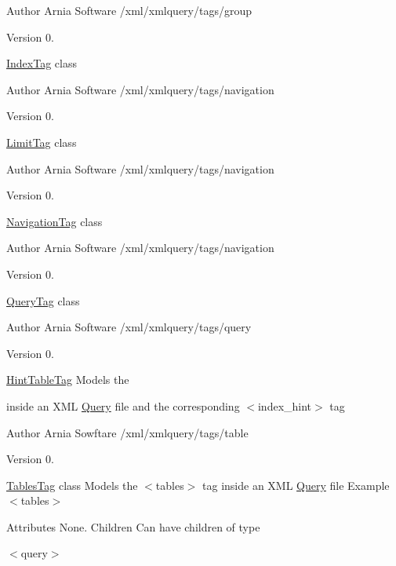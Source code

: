 \begin{DoxyAuthor}{Author}
Arnia Software /xml/xmlquery/tags/group 
\end{DoxyAuthor}
\begin{DoxyVersion}{Version}
0.
\end{DoxyVersion}
\hyperlink{classIndexTag}{Index\+Tag} class

\begin{DoxyAuthor}{Author}
Arnia Software /xml/xmlquery/tags/navigation 
\end{DoxyAuthor}
\begin{DoxyVersion}{Version}
0.
\end{DoxyVersion}
\hyperlink{classLimitTag}{Limit\+Tag} class

\begin{DoxyAuthor}{Author}
Arnia Software /xml/xmlquery/tags/navigation 
\end{DoxyAuthor}
\begin{DoxyVersion}{Version}
0.
\end{DoxyVersion}
\hyperlink{classNavigationTag}{Navigation\+Tag} class

\begin{DoxyAuthor}{Author}
Arnia Software /xml/xmlquery/tags/navigation 
\end{DoxyAuthor}
\begin{DoxyVersion}{Version}
0.
\end{DoxyVersion}
\hyperlink{classQueryTag}{Query\+Tag} class

\begin{DoxyAuthor}{Author}
Arnia Software /xml/xmlquery/tags/query 
\end{DoxyAuthor}
\begin{DoxyVersion}{Version}
0.
\end{DoxyVersion}
\hyperlink{classHintTableTag}{Hint\+Table\+Tag} Models the \begin{TabularC}{0}
\hline
\end{TabularC}
inside an X\+M\+L \hyperlink{classQuery}{Query} file and the corresponding $<$index\+\_\+hint$>$ tag

\begin{DoxyAuthor}{Author}
Arnia Sowftare /xml/xmlquery/tags/table 
\end{DoxyAuthor}
\begin{DoxyVersion}{Version}
0.
\end{DoxyVersion}
\hyperlink{classTablesTag}{Tables\+Tag} class Models the $<$tables$>$ tag inside an X\+M\+L \hyperlink{classQuery}{Query} file  Example $<$tables$>$ \begin{TabularC}{0}
\hline
\end{TabularC}
Attributes None. Children Can have children of type \begin{TabularC}{0}
\hline
\end{TabularC}
$<$query$>$

